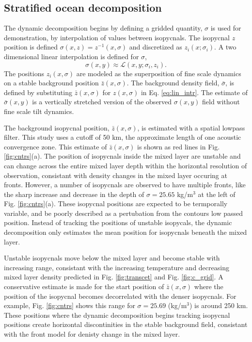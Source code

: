\documentclass[preprint,NumberedRefs]{JASA}
\begin{document}
\subsection{Stratified ocean decomposition}
The dynamic decomposition begins by defining a gridded quantity, $\sigma$ is used for demonstration, by interpolation of values between isopycnals. The isopycnal $z$ position is defined $\sigma(x, z) = z^{-1}(x, \sigma)$ and discretized as $z_i(x; \sigma_i)$. A two dimensional linear interpolation is defined for $\sigma$,
\begin{equation}
    \sigma(x,y)\approx\mathcal{L}(x, y; \sigma_i, z_i).
    \label{eq:lin_intr}
\end{equation}
The positions $z_i(x, \sigma)$ are modeled as the superposition of fine scale dynamics on a stable background position $\bar{z}(x, \sigma)$. The background density field, $\bar{\sigma}$, is defined by substituting $\bar{z}(x, \sigma)$ for $z(x, \sigma)$ in Eq. \eqref{eq:lin_intr}. The estimate of $\bar{\sigma}(x,y)$ is a vertically stretched version of the observed $\sigma(x,y)$ field without fine scale tilt dynamics.

The background isopycnal position, $\bar{z}(x, \sigma)$, is estimated with a spatial lowpass filter. This study uses a cutoff of 50 km, the approximate length of one acoustic convergence zone\cite{jensen2011computational}. This estimate of $\bar{z}(x, \sigma)$ is shown as red lines in Fig. \ref{fig:cntrs}(a). The position of isopycnals inside the mixed layer are unstable and can change across the entire mixed layer depth within the horizontal resolution of observation, consistant with density changes in the mixed layer occuring at fronts. However, a number of isopycnals are observed to have multiple fronts, like the sharp increase and decrease in the depth of $\sigma=25.65$ kg/m$^3$ at the left of Fig. \ref{fig:cntrs}(a). These isopycnal positions are expected to be termporally variable, and be poorly described as a pertubation from the contours low passed position. Instead of tracking the positions of unstable isopycals, the dynamic decomposition only estimates the mean position for isopycnals beneath the mixed layer.

Unstable isopycnals move below the mixed layer and become stable with increasing range, consistant with the increasing temperature and decreasing mixed layer density predicted in Fig. \ref{fig:transcet} and Fig. \ref{fig:c_grid}. A conservative estimate is made for the start position of $\bar{z}(x, \sigma)$ where the position of the isopycnal becomes decorrelated with the denser isopycnals. For example, Fig. \ref{fig:cntrs} shows this range for $\sigma=25.69$ (kg/m$^3$) is around 250 km. These positions where the dynamic decomposition begins tracking isopycnal positions create horizontal discontinities in the stable background field, consistant with the front model for denisty change in the mixed layer.
\end{document}
